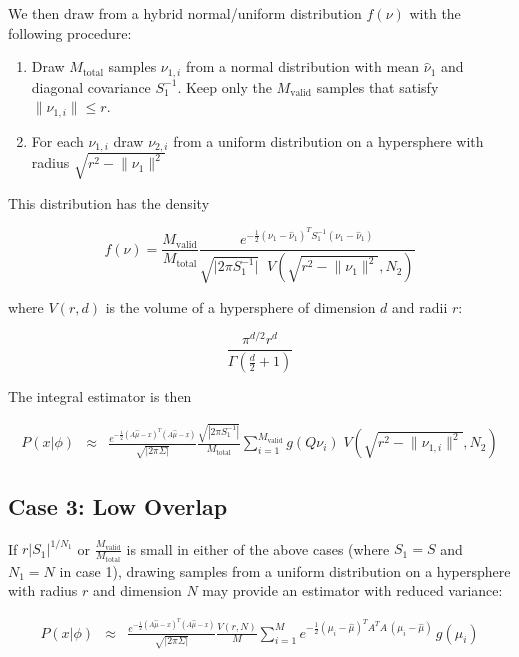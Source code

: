 \documentclass{amsart}
\begin{document}
We then draw from a hybrid normal/uniform distribution $f(\nu)$ with
the following procedure:
\begin{enumerate}
\item Draw $M_{\mathrm{total}}$ samples $\nu_{1,i}$ from a normal
  distribution with mean $\hat{\nu}_1$ and diagonal covariance
  $S_1^{-1}$.  Keep only the $M_{\mathrm{valid}}$ samples that satisfy
  $\lVert \nu_{1,i} \rVert \le r$.
\item For each $\nu_{1,i}$ draw $\nu_{2,i}$ from a uniform distribution on a 
  hypersphere with radius $\sqrt{r^2 - \lVert \nu_1 \rVert^2}$
\end{enumerate}

This distribution has the density

\begin{equation}
  f(\nu) = \frac{M_{\mathrm{valid}}}{M_{\mathrm{total}}}
  \frac{e^{-\frac{1}{2}(\nu_1-\hat{\nu}_1)^T S_1^{-1} (\nu_1-\hat{\nu}_1)}}
       {\sqrt{\lvert 2\pi S_1^{-1} \rvert}
         \;\;V\!\left(\sqrt{r^2 - \lVert \nu_1 \rVert^2}, N_2\right)}
\end{equation}

where $V(r,d)$ is the volume of a hypersphere of dimension $d$ and
radii $r$:

\begin{equation}
  \frac{\pi^{d/2}r^d}{\Gamma(\frac{d}{2} + 1)}
\end{equation}

The integral estimator is then

\begin{eqnarray}
  P(x|\phi) &\approx& 
  \frac{e^{-\frac{1}{2}(A\hat{\mu}-x)^T(A\hat{\mu}-x)}}
       {\sqrt{\left|2\pi\Sigma\right|}}
  \frac{\sqrt{\left|2\pi S_1^{-1}\right|}}{M_{\mathrm{total}}}
  \sum_{i=1}^{M_{\mathrm{valid}}} g(Q\nu_i)\;
  V\!\left(\sqrt{r^2 - \lVert \nu_{1,i} \rVert^2}, N_2\right)
\end{eqnarray}

\subsection{Case 3: Low Overlap}

If $r \lvert S_1 \rvert^{1/N_1}$ or
$\frac{M_{\mathrm{valid}}}{M_{\mathrm{total}}}$ is small 
in either of the above cases (where $S_1=S$ and $N_1=N$ in case 1),
drawing samples from a uniform distribution on a hypersphere with
radius $r$ and dimension $N$ may provide an estimator with reduced variance:

\begin{eqnarray}
  P(x|\phi) &\approx& 
  \frac{e^{-\frac{1}{2}(A\hat{\mu}-x)^T(A\hat{\mu}-x)}}
       {\sqrt{\left|2\pi\Sigma\right|}}
  \frac{V(r,N)}{M}
  \sum_{i=1}^{M} e^{-\frac{1}{2}(\mu_i-\hat{\mu})^T\!A^T\!A\,(\mu_i-\hat{\mu})}\,g(\mu_i)
\end{eqnarray}
\end{document}
